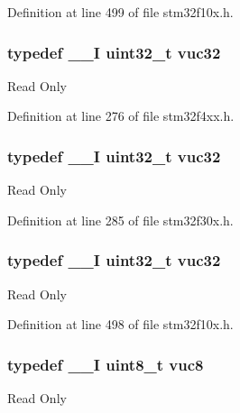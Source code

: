 Definition at line 499 of file stm32f10x.\-h.

\hypertarget{group___exported__types_ga2e08e321a35a55e72c5b3a507e76371f}{
\subsubsection[{vuc32}]{\setlength{\rightskip}{0pt plus 5cm}typedef \-\_\-\-\_\-\-I {\bf uint32\-\_\-t} {\bf vuc32}}}\label{group___exported__types_ga2e08e321a35a55e72c5b3a507e76371f}
Read Only 

Definition at line 276 of file stm32f4xx.\-h.

\hypertarget{group___exported__types_ga2e08e321a35a55e72c5b3a507e76371f}{
\subsubsection[{vuc32}]{\setlength{\rightskip}{0pt plus 5cm}typedef \-\_\-\-\_\-\-I {\bf uint32\-\_\-t} {\bf vuc32}}}\label{group___exported__types_ga2e08e321a35a55e72c5b3a507e76371f}
Read Only 

Definition at line 285 of file stm32f30x.\-h.

\hypertarget{group___exported__types_ga2e08e321a35a55e72c5b3a507e76371f}{
\subsubsection[{vuc32}]{\setlength{\rightskip}{0pt plus 5cm}typedef \-\_\-\-\_\-\-I {\bf uint32\-\_\-t} {\bf vuc32}}}\label{group___exported__types_ga2e08e321a35a55e72c5b3a507e76371f}
Read Only 

Definition at line 498 of file stm32f10x.\-h.

\hypertarget{group___exported__types_gab0ec90ac9b2c5864755998c8d37c264a}{
\subsubsection[{vuc8}]{\setlength{\rightskip}{0pt plus 5cm}typedef \-\_\-\-\_\-\-I {\bf uint8\-\_\-t} {\bf vuc8}}}\label{group___exported__types_gab0ec90ac9b2c5864755998c8d37c264a}
Read Only 

